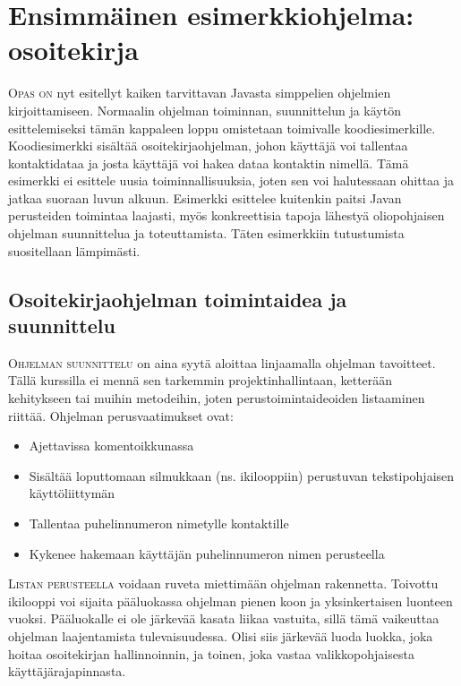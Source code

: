 \documentclass[openany]{book}
\newcommand{\newthought}[1]{\smallskip\textsc{#1}}
\begin{document}

\section{Ensimmäinen esimerkkiohjelma: osoitekirja}
\label{osoitekirja}

\newthought{Opas on} nyt esitellyt kaiken tarvittavan Javasta simppelien ohjelmien
kirjoittamiseen. Normaalin ohjelman toiminnan, suunnittelun ja käytön esittelemiseksi tämän
kappaleen loppu omistetaan toimivalle koodiesimerkille. Koodiesimerkki sisältää
osoitekirjaohjelman, johon käyttäjä voi tallentaa kontaktidataa ja josta käyttäjä voi hakea dataa
kontaktin nimellä. Tämä esimerkki ei esittele uusia toiminnallisuuksia, joten sen voi halutessaan
ohittaa ja jatkaa suoraan luvun  alkuun. Esimerkki esittelee kuitenkin
paitsi Javan perusteiden toimintaa laajasti, myös konkreettisia tapoja lähestyä oliopohjaisen
ohjelman suunnittelua ja toteuttamista. Täten esimerkkiin tutustumista suositellaan lämpimästi.

\subsection{Osoitekirjaohjelman toimintaidea ja suunnittelu}
\label{osoitekirja suunnittelu}

\newthought{Ohjelman suunnittelu} on aina syytä aloittaa linjaamalla ohjelman tavoitteet. Tällä
kurssilla ei mennä sen tarkemmin projektinhallintaan, ketterään kehitykseen tai muihin metodeihin,
joten perustoimintaideoiden listaaminen riittää. Ohjelman perusvaatimukset ovat:

\begin{itemize}
	\item Ajettavissa komentoikkunassa
	\item Sisältää loputtomaan silmukkaan (ns. ikilooppiin) perustuvan tekstipohjaisen käyttöliittymän
	\item Tallentaa puhelinnumeron nimetylle kontaktille
	\item Kykenee hakemaan käyttäjän puhelinnumeron nimen perusteella
\end{itemize}

\newthought{Listan perusteella} voidaan ruveta miettimään ohjelman rakennetta. Toivottu ikilooppi
voi sijaita pääluokassa ohjelman pienen koon ja yksinkertaisen luonteen vuoksi. Pääluokalle ei ole
järkevää kasata liikaa vastuita, sillä tämä vaikeuttaa ohjelman laajentamista tulevaisuudessa.
Olisi siis järkevää luoda luokka, joka hoitaa osoitekirjan hallinnoinnin, ja toinen, joka vastaa
valikkopohjaisesta käyttäjärajapinnasta.
\end{document}
